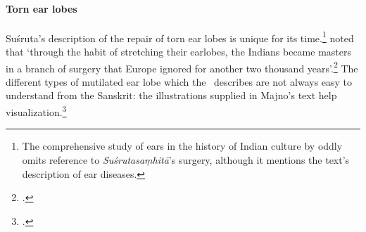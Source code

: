 

\paragraph{Torn ear lobes}

Suśruta's description of the repair of torn ear lobes is  unique for
its time.\footnote{The comprehensive study of ears in the history of Indian culture 
by \citet{boll-2010} oddly omits reference to \emph{Suśrutasaṃhitā}'s surgery, 
although it mentions the text's description of ear diseases.}  
\citeauthor{majn-1975} noted that `through the habit of
stretching their earlobes, the Indians became masters in a branch of surgery
that Europe ignored for another two thousand years'.\footcite[291]{majn-1975}  
The different types of
mutilated ear lobe which the \SS\ describes are not always easy to understand
from the Sanskrit: the illustrations supplied in Majno's text help
visualization.\footcites[290--291]{majn-1975}[reproduced with permission 
in][92--93]{wuja-2003}



